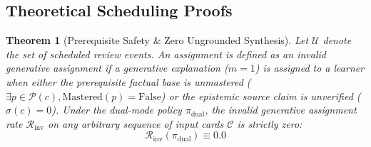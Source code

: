 \documentclass[11pt,a4paper]{article}
\newtheorem{theorem}{Theorem}
\begin{document}
\subsection{Theoretical Scheduling Proofs}

\begin{theorem}[Prerequisite Safety \& Zero Ungrounded Synthesis]
\label{thm:safety}
Let $\mathcal{U}$ denote the set of scheduled review events. An assignment is defined as an \textit{invalid generative assignment} if a generative explanation ($m=1$) is assigned to a learner when either the prerequisite factual base is unmastered ($\exists p \in \mathcal{P}(c), \text{Mastered}(p) = \text{False}$) or the epistemic source claim is unverified ($\sigma(c) = 0$). Under the dual-mode policy $\pi_{\text{dual}}$, the invalid generative assignment rate $\mathcal{R}_{\text{inv}}$ on any arbitrary sequence of input cards $\mathcal{C}$ is strictly zero:
\begin{equation}
    \mathcal{R}_{\text{inv}}(\pi_{\text{dual}}) \equiv 0.0
\end{equation}
\end{theorem}
\end{document}
